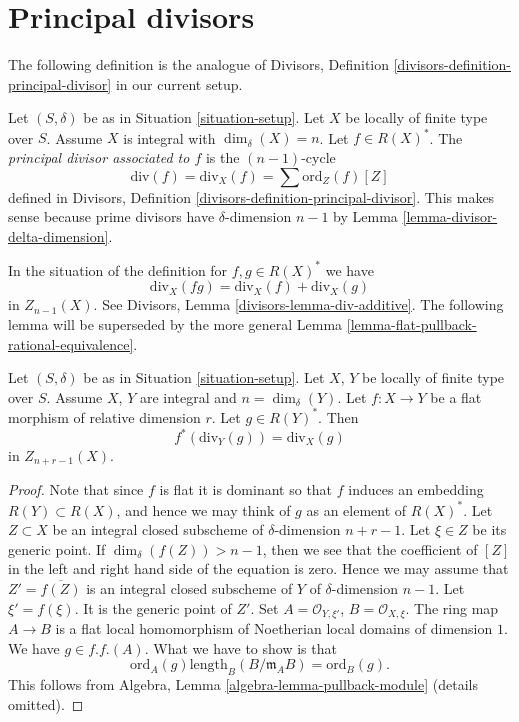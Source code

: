 \section{Principal divisors}
\label{section-principal-divisors}

\noindent
The following definition is the analogue of
Divisors, Definition \ref{divisors-definition-principal-divisor}
in our current setup.

\begin{definition}
\label{definition-principal-divisor}
Let $(S, \delta)$ be as in Situation \ref{situation-setup}.
Let $X$ be locally of finite type over $S$. Assume $X$ is
integral with $\dim_\delta(X) = n$.
Let $f \in R(X)^*$. The {\it principal divisor
associated to $f$} is the $(n - 1)$-cycle
$$
\text{div}(f) = \text{div}_X(f) = \sum \text{ord}_Z(f) [Z]
$$
defined in Divisors, Definition \ref{divisors-definition-principal-divisor}.
This makes sense because prime divisors have $\delta$-dimension $n - 1$ by
Lemma \ref{lemma-divisor-delta-dimension}.
\end{definition}

\noindent
In the situation of the definition for $f, g \in R(X)^*$ we have
$$
\text{div}_X(fg) = \text{div}_X(f) + \text{div}_X(g)
$$
in $Z_{n - 1}(X)$. See Divisors, Lemma \ref{divisors-lemma-div-additive}.
The following lemma will be superseded by the more general
Lemma \ref{lemma-flat-pullback-rational-equivalence}.

\begin{lemma}
\label{lemma-flat-pullback-principal-divisor}
Let $(S, \delta)$ be as in Situation \ref{situation-setup}.
Let $X$, $Y$ be locally of finite type over $S$. Assume $X$, $Y$
are integral and $n = \dim_\delta(Y)$.
Let $f : X \to Y$ be a flat morphism of relative dimension $r$.
Let $g \in R(Y)^*$. Then
$$
f^*(\text{div}_Y(g)) = \text{div}_X(g)
$$
in $Z_{n + r - 1}(X)$.
\end{lemma}

\begin{proof}
Note that since $f$ is flat it is dominant so that
$f$ induces an embedding $R(Y) \subset R(X)$, and hence
we may think of $g$ as an element of $R(X)^*$.
Let $Z \subset X$ be an integral closed subscheme of
$\delta$-dimension $n + r - 1$. Let $\xi \in Z$
be its generic point. If $\dim_\delta(f(Z)) > n - 1$,
then we see that the coefficient of $[Z]$ in the left and
right hand side of the equation is zero.
Hence we may assume that $Z' = \overline{f(Z)}$ is an
integral closed subscheme of $Y$ of $\delta$-dimension $n - 1$.
Let $\xi' = f(\xi)$. It is the generic point of $Z'$.
Set $A = \mathcal{O}_{Y, \xi'}$, $B = \mathcal{O}_{X, \xi}$.
The ring map $A \to B$ is a flat local homomorphism of
Noetherian local domains of dimension $1$.
We have $g \in f.f.(A)$. What we have to show is that
$$
\text{ord}_A(g) \text{length}_B(B/\mathfrak m_AB)
=
\text{ord}_B(g).
$$
This follows from Algebra, Lemma \ref{algebra-lemma-pullback-module}
(details omitted).
\end{proof}











